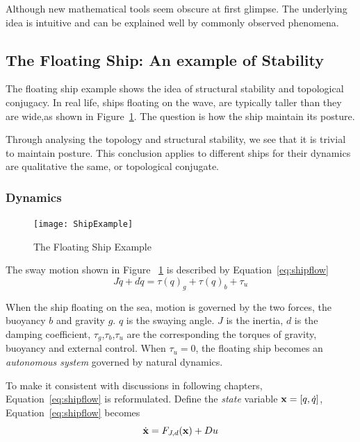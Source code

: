 Although new mathematical tools seem obscure at first glimpse.
The underlying idea is intuitive and can be explained well by commonly observed phenomena.



\subsection{The Floating Ship: An example of Stability}
The floating ship  example shows the idea of structural stability and topological conjugacy.
In real life, ships floating on the wave, are typically taller than they are wide,as shown in Figure~\ref{fig:ShipFloating}.
The  question is how the ship maintain its posture.

Through analysing the topology and structural stability, we see that it is trivial to maintain posture.
This conclusion applies to different ships for their dynamics are qualitative the same, or topological conjugate.


\subsubsection*{Dynamics}

\begin{figure}[!htbp]
  \begin{center}
    \texttt{[image: ShipExample]}
    \caption{The Floating Ship Example}
    \label{fig:ShipFloating}
  \end{center}
\end{figure}

The sway motion shown in Figure ~\ref{fig:ShipFloating} is described by Equation~\ref{eq:shipflow}
\begin{equation}
\label{eq:shipflow}
J\ddot{q}+d\dot{q}=\tau(q)_{g}+\tau(q)_{b}+\tau_{u}
\end{equation}

When the ship floating on the sea, motion is governed by the two forces, the buoyancy $b$ and gravity $g$.
$q$ is the swaying angle.
$J$ is the inertia,  
$d$ is the damping coefficient,
$\tau_{g}$,$\tau_{b}$,$\tau_{u}$ are the corresponding the torques of gravity, buoyancy and external control.
When $\tau_{u}=0$,  the floating ship  becomes an \emph{autonomous system} governed by natural dynamics.

To make it consistent with discussions in following chapters, Equation~\ref{eq:shipflow} is reformulated.
Define the \emph{state} variable $\mathbf{x}=[q,\dot{q}]$, Equation~\ref{eq:shipflow} becomes
\[
\dot{\mathbf{x}}=F_{J,d}(\mathbf{x})+Du
\]

